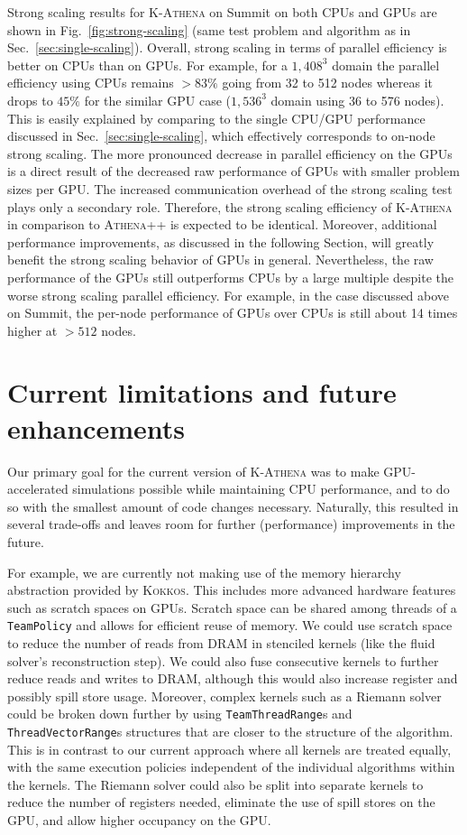\documentclass[10pt,journal,compsoc]{IEEEtran}
\newcommand{\textcode}[1]{\textsc{#1}}
\newcommand{\kokkos}{\textcode{Kokkos}\xspace}
\newcommand{\athena}{\textcode{Athena++}\xspace}
\newcommand{\kathena}{\textcode{K-Athena}\xspace}
\begin{document}
Strong scaling results for \kathena on Summit on both CPUs and GPUs are shown in
Fig.~\ref{fig:strong-scaling} (same test problem and algorithm as in
Sec.~\ref{sec:single-scaling}).
Overall, strong scaling in terms of parallel efficiency is better on CPUs than on GPUs.
For example, for a $1{,}408^3$ domain the parallel efficiency using CPUs remains $>83\%$ 
going from 32 to 512 nodes whereas it drops to $45\%$ for the similar GPU case ($1{,}536^3$ 
domain using 36 to 576 nodes).
This is easily explained by comparing to the single CPU/GPU performance discussed in
Sec.~\ref{sec:single-scaling}, which effectively corresponds to on-node strong scaling.
The more pronounced decrease in parallel efficiency on the GPUs is a direct result of
the decreased raw performance of GPUs with smaller problem sizes per GPU.
The increased communication overhead of the strong scaling test plays only a secondary 
role.
Therefore, the strong scaling efficiency of \kathena in comparison to
\athena is expected to be identical.
Moreover, additional performance improvements, as discussed in the following Section,
will greatly benefit the strong scaling behavior of GPUs in general.
Nevertheless, the raw performance of the GPUs still outperforms CPUs
by a large multiple
despite the worse strong scaling parallel efficiency.
For example, in the case discussed above on Summit, the per-node performance of GPUs over CPUs
is still about 14 times higher at $>512$ nodes.

\section{Current limitations and future enhancements}
\label{sec:limit-and-enhance}
Our primary goal for the current version of \kathena was to make GPU-accelerated 
simulations possible while maintaining CPU performance, and to do so with the smallest amount of
code changes necessary.
Naturally, this resulted in several trade-offs and leaves room for further (performance)
improvements in the future.

For example, we are currently not making use of the memory hierarchy abstraction
provided by \kokkos.
This includes  more advanced hardware features such as
scratch spaces on GPUs.
Scratch space can be shared among threads of a \texttt{TeamPolicy} and allows for efficient
reuse of memory.
We could use scratch space to reduce the number of reads from DRAM in stenciled
kernels (like the fluid solver's reconstruction step). We could also fuse consecutive kernels
to further reduce reads and writes to DRAM, although this would also increase
register and possibly spill store usage.
Moreover, complex kernels such as a Riemann solver could be broken down further by using
\texttt{TeamThreadRange}s and \texttt{ThreadVectorRange}s structures that are closer to
the structure of the algorithm.
This is in contrast to our current approach where all kernels are treated equally, with the 
same execution policies independent of the individual algorithms within the kernels.
The Riemann solver could also be split into separate kernels to reduce the
number of registers needed, eliminate the use of spill stores on the GPU, and
allow higher occupancy on the GPU.
\end{document}
